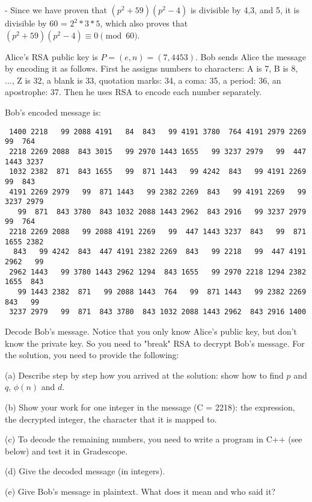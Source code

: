 \documentclass{article}
\begin{document}
\begin{problem}
\vspace{0.1in}
- Since we have proven that $(p^2 +59)(p^2 -4)$ is divisible by 4,3, and 5, it is divisible by 60 = $2^2 * 3 * 5$, which also proves that $(p^2 +59)(p^2 -4)\equiv 0 \pmod{60}$.
\end{problem}


\vspace{0.05in}
\begin{problem}

\vspace{0.05in}
\noindent  Alice's RSA public key is $P = (e,n) = (7, 4453)$.
Bob sends Alice the message by encoding it as follows.
First he assigns numbers to characters:
A is 7, B is 8, ..., Z is 32, a blank is 33, quotation marks: 34, a coma:  35, a period: 36, an apostrophe: 37. Then he uses RSA to encode each number separately. 

\vspace{0.1in}
\noindent Bob's encoded message is:

\begin{verbatim}
 1400 2218   99 2088 4191   84  843   99 4191 3780  764 4191 2979 2269   99  764 
 2218 2269 2088  843 3015   99 2970 1443 1655   99 3237 2979   99  447 1443 3237 
 1032 2382  871  843 1655   99  871 1443   99 4242  843   99 4191 2269   99  843 
 4191 2269 2979   99  871 1443   99 2382 2269  843   99 4191 2269   99 3237 2979 
   99  871  843 3780  843 1032 2088 1443 2962  843 2916   99 3237 2979   99  764 
 2218 2269 2088   99 2088 4191 2269   99  447 1443 3237  843   99  871 1655 2382 
  843   99 4242  843  447 4191 2382 2269  843   99 2218   99  447 4191 2962   99
 2962 1443   99 3780 1443 2962 1294  843 1655   99 2970 2218 1294 2382 1655  843 
   99 1443 2382  871   99 2088 1443  764   99  871 1443   99 2382 2269  843   99 
 3237 2979   99  871  843 3780  843 1032 2088 1443 2962  843 2916 1400

\end{verbatim}

\vspace{-0.1in}
\noindent Decode Bob's message.
Notice that you only know Alice's public key, but don't know the private key. So you
need to "break" RSA to decrypt Bob's message. For the solution, you need to provide the following:
%
\begin{description}

	\item (a) Describe step by step how you 
	arrived at the solution: show how to find $p$ and $q$, $\phi(n)$ and $d$. 
	\item (b) Show your work for one integer in the message (C = 2218):  the expression, the decrypted integer, the character that it is mapped to.  
    \item (c) To decode the remaining numbers, you need to write a program in C++ (see below) and test it in Gradescope.
	\item (d) Give the decoded message (in integers).
	\item (e) Give Bob's message in
	plaintext. What does it mean and who said it?


\end{description}
\end{problem}
\end{document}
